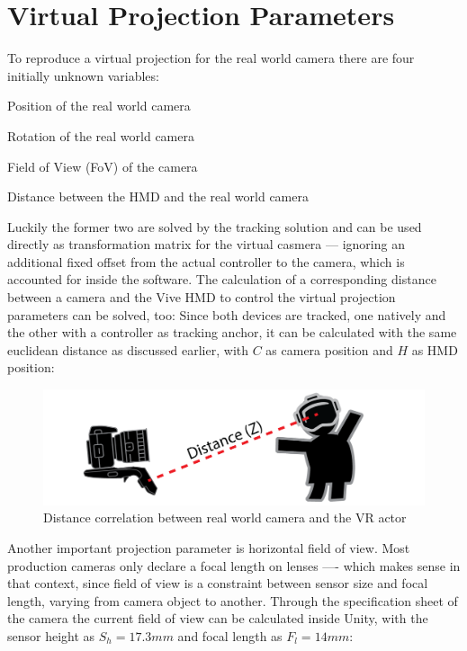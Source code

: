 %
\section{Virtual Projection Parameters}
\label{sec:projection-params}
To reproduce a virtual projection for the real world camera there are four 
initially unknown variables:

\begin{my_list}
	\item Position of the real world camera
	\item Rotation of the real world camera
	\item Field of View (FoV) of the camera
	\item Distance between the HMD and the real world camera
\end{my_list}

Luckily the former two are solved by the tracking solution and can be used 
directly as transformation matrix for the virtual casmera --- ignoring an 
additional fixed offset from the actual controller to the camera, which is 
accounted for inside the software.
\newline
The calculation of a corresponding distance between a camera and the Vive HMD 
to control the virtual projection parameters can be solved, too: Since both 
devices are tracked, one natively and the other with a controller as 
tracking anchor, it can be calculated with the same euclidean distance as 
discussed earlier, with $C$ as camera position and $H$ as HMD position:


\begin{figure}[htb]
	\includegraphics[width=\textwidth]{gfx/distance-z.png}
	\caption{Distance correlation between real world camera and the VR actor}
	\label{fig:projection:distance}
\end{figure}

Another important projection parameter is horizontal field of view. Most 
production cameras only declare a focal length on lenses ---- which makes sense 
in that context, since field of view is a constraint between sensor size and 
focal length, varying from camera object to another. Through the specification 
sheet of the camera the current field of view can be calculated inside Unity, 
with the sensor height as $S_h = 17.3mm$ and focal length as $F_l = 14mm$:

